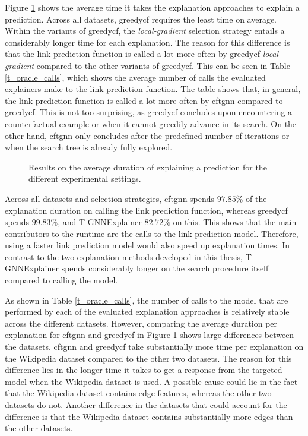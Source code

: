 Figure \ref{f_duration} shows the average time it takes the explanation approaches to explain a prediction. Across all datasets, \gls{greedycf} requires the least time on average. Within the variants of \gls{greedycf}, the \textit{local-gradient} selection strategy entails a considerably longer time for each explanation. The reason for this difference is that the link prediction function is called a lot more often by \gls{greedycf}-\textit{local-gradient} compared to the other variants of \gls{greedycf}. This can be seen in Table \ref{t_oracle_calls}, which shows the average number of calls the evaluated explainers make to the link prediction function. The table shows that, in general, the link prediction function is called a lot more often by \gls{cftgnn} compared to \gls{greedycf}. This is not too surprising, as \gls{greedycf} concludes upon encountering a counterfactual example or when it cannot greedily advance in its search. On the other hand, \gls{cftgnn} only concludes after the predefined number of iterations or when the search tree is already fully explored.

\begin{figure}
    \centering
    
    \caption{Results on the average duration of explaining a prediction for the different experimental settings.}
    \label{f_duration}
\end{figure}


Across all datasets and selection strategies, \gls{cftgnn} spends $97.85\%$ of the explanation duration on calling the link prediction function, whereas \gls{greedycf} spends $99.83\%$, and T-GNNExplainer $82.72\%$ on this. This shows that the main contributors to the runtime are the calls to the link prediction model. Therefore, using a faster link prediction model would also speed up explanation times. In contrast to the two explanation methods developed in this thesis, T-GNNExplainer spends considerably longer on the search procedure itself compared to calling the model.

As shown in Table \ref{t_oracle_calls}, the number of calls to the model that are performed by each of the evaluated explanation approaches is relatively stable across the different datasets. However, comparing the average duration per explanation for \gls{cftgnn} and \gls{greedycf} in Figure \ref{f_duration} shows large differences between the datasets. \gls{cftgnn} and \gls{greedycf} take substantially more time per explanation on the Wikipedia dataset compared to the other two datasets.
The reason for this difference lies in the longer time it takes to get a response from the targeted model when the Wikipedia dataset is used. A possible cause could lie in the fact that the Wikipedia dataset contains edge features, whereas the other two datasets do not. 
Another difference in the datasets that could account for the difference is that the Wikipedia dataset contains substantially more edges than the other datasets.

